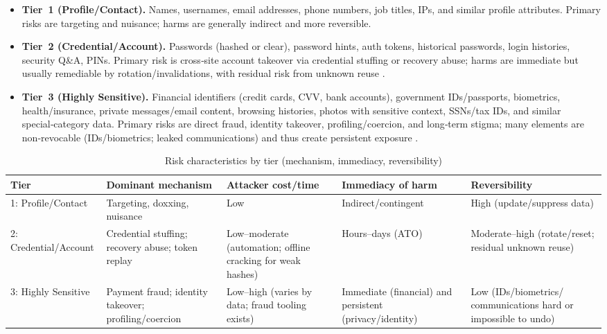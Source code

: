 \documentclass[12pt, letterpaper]{article}
\begin{document}
\begin{itemize}\setlength{\itemsep}{2pt}
\item \textbf{Tier~1 (Profile/Contact).} Names, usernames, email addresses, phone numbers, job titles, IPs, and similar profile attributes. Primary risks are targeting and nuisance; harms are generally indirect and more reversible.

\item \textbf{Tier~2 (Credential/Account).} Passwords (hashed or clear), password hints, auth tokens, historical passwords, login histories, security Q\&A, PINs. Primary risk is cross‑site account takeover via credential stuffing or recovery abuse; harms are immediate but usually remediable by rotation/invalidations, with residual risk from unknown reuse \citep{NIST80063B,OWASPCredStuff,kanta2021viable}.

\item \textbf{Tier~3 (Highly Sensitive).} Financial identifiers (credit cards, CVV, bank accounts), government IDs/passports, biometrics, health/insurance, private messages/email content, browsing histories, photos with sensitive context, SSNs/tax IDs, and similar special‑category data. Primary risks are direct fraud, identity takeover, profiling/coercion, and long‑term stigma; many elements are non‑revocable (IDs/biometrics; leaked communications) and thus create persistent exposure \citep{NIST800122, GDPRArticle9, FTC2025Fraud, NISTBiometricsPrivacy, ICOSpecialCategory}.
\end{itemize}


\begin{table}[ht]
\centering
\small
\caption{Risk characteristics by tier (mechanism, immediacy, reversibility)}
\label{tab:risk-tiers}
\begin{adjustbox}{max width=\textwidth}
\begin{tabular}{@{}l p{4cm} p{3cm} p{3cm} p{3.3cm}@{}}
\toprule
Tier & Dominant mechanism & Attacker cost/time & Immediacy of harm & Reversibility \\
\midrule
1: Profile/Contact & Targeting, doxxing, nuisance & Low & Indirect/contingent & High (update/suppress data) \\
2: Credential/Account & Credential stuffing; recovery abuse; token replay & Low--moderate (automation; offline cracking for weak hashes) & Hours--days (ATO) & Moderate--high (rotate/reset; residual unknown reuse) \\
3: Highly Sensitive & Payment fraud; identity takeover; profiling/coercion & Low--high (varies by data; fraud tooling exists) & Immediate (financial) and persistent (privacy/identity) & Low (IDs/biometrics/ communications hard or impossible to undo) \\
\bottomrule
\end{tabular}
\end{adjustbox}
\end{table}
\end{document}

